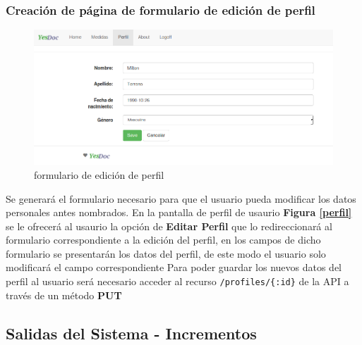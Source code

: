 \subsubsection{Creación de página de formulario de edición de perfil}      
\begin{figure}[h]
        \centering
        \includegraphics[width=1\textwidth]{img/tp1_parte2/1-editar_perfil}
        \caption{formulario de edición de perfil}
		\label{editar_perfil}
\end{figure}
Se generará el formulario necesario para que el usuario pueda modificar los datos personales antes nombrados. 
En la pantalla de perfil de usaurio \textbf{Figura \ref{perfil}} se le ofrecerá al usaurio la opción de \textbf{Editar Perfil} que lo redireccionará al formulario correspondiente a la edición del perfil, en los campos de dicho formulario se presentarán los datos del perfil, de este modo el usuario solo modificará el campo correspondiente
      Para poder guardar los nuevos datos del perfil al usuario será necesario  acceder al recurso \texttt{/profiles/\{:id\}} de la API a través de un método \textbf{PUT}

    
    
\subsection {Salidas del Sistema - Incrementos}


